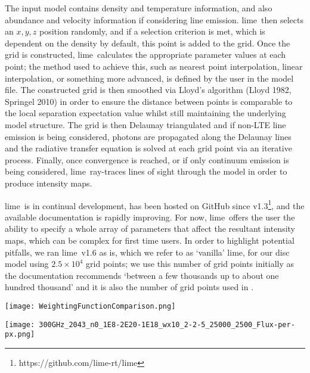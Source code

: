 \documentclass[fleqn,usenatbib]{mnras}
\newcommand{\lime}{{\sc lime}}
\begin{document}
The input model contains density and temperature information, and also abundance and velocity information if considering line emission. \lime\ then selects an $x, y, z$ position randomly, and if a selection criterion is met, which is dependent on the density by default, this point is added to the grid. Once the grid is constructed, \lime\ calculates the appropriate parameter values at each point; the method used to achieve this, such as nearest point interpolation, linear interpolation, or something more advanced, is defined by the user in the model file. The constructed grid is then smoothed via Lloyd's algorithm (Lloyd 1982, Springel 2010) in order to ensure the distance between points is comparable to the local separation expectation value whilst still maintaining the underlying model structure. The grid is then Delaunay triangulated and if non-LTE line emission is being considered, photons are propagated along the Delaunay lines and the radiative transfer equation is solved at each grid point via an iterative process. Finally, once convergence is reached, or if only continuum emission is being considered, \lime\ ray-traces lines of sight through the model in order to produce intensity maps.

\smallskip

\lime\ is in continual development, has been hosted on GitHub since v1.3\footnote{https://github.com/lime-rt/lime}, and the available documentation is rapidly improving. For now, \lime\ offers the user the ability to specify a whole array of parameters that affect the resultant intensity maps, which can be complex for first time users. In order to highlight potential pitfalls, we ran \lime\ v1.6 as is, which we refer to as `vanilla' \lime, for our disc model using $2.5 \times 10^4$ grid points; we use this number of grid points initially as the documentation recommends `between a few thousands up to about one hundred thousand' and it is also the number of grid points used in \citet{Douglas&Caselli2013}. 

\begin{figure*}
    \texttt{[image: WeightingFunctionComparison.png]}
    \caption{Probability of grid point selection as the density weighting parameters, $n_0$ and $w$, are varied. The vertical lines correspond to approximate number densities within various features of the disc model, as labelled.}
    \label{fig:weightingbars}
\end{figure*}

\begin{figure*}
    \texttt{[image: 300GHz\_2043\_n0\_1E8-2E20-1E18\_wx10\_2-2-5\_25000\_2500\_Flux-per-px.png]}
    \caption{Comparison between 300\,GHz flux images produced by \lime\ using varied $n_0$ and $w$ parameters, demonstrating that \lime\ images are sensitive to the weighting imposed. The inset figures show the distribution of number densities of the grid points, confined within the disc region, that produce the corresponding image, with the vertical lines corresponding to the key in Figure \ref{fig:weightingbars}.}
    \label{fig:weightingcompare}
\end{figure*}
\end{document}
